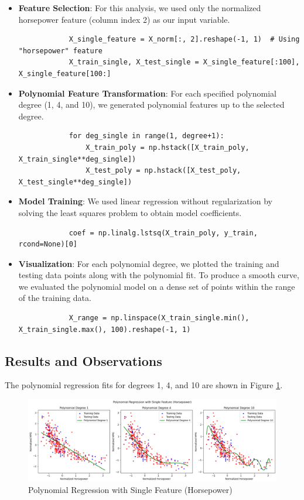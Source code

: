 \documentclass{article}
\begin{document}
	\begin{itemize}
		\item \textbf{Feature Selection}: For this analysis, we used only the normalized horsepower feature (column index 2) as our input variable.
		\begin{verbatim}
			X_single_feature = X_norm[:, 2].reshape(-1, 1)  # Using "horsepower" feature
			X_train_single, X_test_single = X_single_feature[:100], X_single_feature[100:]
		\end{verbatim}
		
		\item \textbf{Polynomial Feature Transformation}: For each specified polynomial degree (1, 4, and 10), we generated polynomial features up to the selected degree.
		\begin{verbatim}
			for deg_single in range(1, degree+1):
				X_train_poly = np.hstack([X_train_poly, X_train_single**deg_single])
				X_test_poly = np.hstack([X_test_poly, X_test_single**deg_single])
		\end{verbatim}
		
		\item \textbf{Model Training}: We used linear regression without regularization by solving the least squares problem to obtain model coefficients.
		\begin{verbatim}
			coef = np.linalg.lstsq(X_train_poly, y_train, rcond=None)[0]
		\end{verbatim}
		
		\item \textbf{Visualization}: For each polynomial degree, we plotted the training and testing data points along with the polynomial fit. To produce a smooth curve, we evaluated the polynomial model on a dense set of points within the range of the training data.
		\begin{verbatim}
			X_range = np.linspace(X_train_single.min(), X_train_single.max(), 100).reshape(-1, 1)
		\end{verbatim}
	\end{itemize}
	
	\subsection*{Results and Observations}
	
	The polynomial regression fits for degrees 1, 4, and 10 are shown in Figure \ref{fig:single_feature_polynomial_fits}. 
	
	\begin{figure}[h!]
		\centering
		\includegraphics[width=\textwidth]{images/q4_part2.png} %
		\caption{Polynomial Regression with Single Feature (Horsepower)}
		\label{fig:single_feature_polynomial_fits}
	\end{figure}
	
\end{document}
